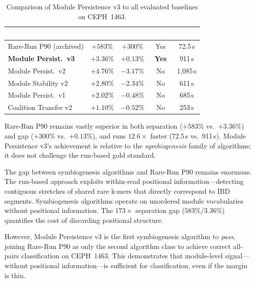 \documentclass{../yalumba}
\begin{document}
\begin{table}[H]
\centering
\tablestyle
\caption{Comparison of Module Persistence v3 to all evaluated baselines
  on CEPH~1463.}
\label{tab:baselines}
\begin{tabular}{@{}lcccc@{}}
\toprule
\rowcolor{table-header}
\textcolor{white}{\textbf{Algorithm}} &
\textcolor{white}{\textbf{Sep.}} &
\textcolor{white}{\textbf{Gap}} &
\textcolor{white}{\textbf{Pass?}} &
\textcolor{white}{\textbf{Time}} \\
\midrule
Rare-Run P90 (archived) & $+583\%$ & $+300\%$ & Yes & 72.5\,s \\
\rowcolor{keyfinding-bg}
\textbf{Module Persist.\ v3} & $+3.36\%$ & $+0.13\%$ & \textbf{Yes} & 911\,s \\
Module Persist.\ v2 & $+4.76\%$ & $-3.17\%$ & No & 1{,}085\,s \\
Module Stability v2 & $+2.80\%$ & $-2.34\%$ & No & 611\,s \\
Module Persist.\ v1 & $+2.02\%$ & $-0.48\%$ & No & 685\,s \\
Coalition Transfer v2 & $+1.10\%$ & $-0.52\%$ & No & 253\,s \\
\bottomrule
\end{tabular}
\end{table}

\begin{limitation}
Rare-Run P90 remains vastly superior in both separation ($+583\%$ vs.\
$+3.36\%$) and gap ($+300\%$ vs.\ $+0.13\%$), and runs $12.6\times$ faster
(72.5\,s vs.\ 911\,s).  Module Persistence v3's achievement is relative to
the \emph{symbiogenesis} family of algorithms; it does not challenge the
run-based gold standard.
\end{limitation}

The gap between symbiogenesis algorithms and Rare-Run P90 remains enormous.
The run-based approach exploits within-read positional information---detecting
contiguous stretches of shared rare k-mers that directly correspond to IBD
segments.  Symbiogenesis algorithms operate on unordered module vocabularies
without positional information.  The $173\times$ separation gap
($583\% / 3.36\%$) quantifies the cost of discarding positional structure.

However, Module Persistence v3 is the first symbiogenesis algorithm to
\emph{pass}, joining Rare-Run P90 as only the second algorithm class to
achieve correct all-pairs classification on CEPH~1463.  This demonstrates
that module-level signal---without positional information---is sufficient for
classification, even if the margin is thin.
\end{document}
